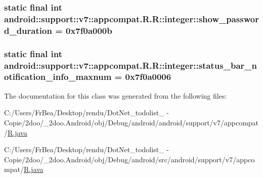 \hypertarget{classandroid_1_1support_1_1v7_1_1appcompat_1_1_r_1_1integer_13473fc83ffcfaf1a80dd29544f8f4f2}{
\subsubsection[{show\_\-password\_\-duration}]{\setlength{\rightskip}{0pt plus 5cm}static final int android::support::v7::appcompat.R.R::integer::show\_\-password\_\-duration = 0x7f0a000b}}
\label{classandroid_1_1support_1_1v7_1_1appcompat_1_1_r_1_1integer_13473fc83ffcfaf1a80dd29544f8f4f2}


\hypertarget{classandroid_1_1support_1_1v7_1_1appcompat_1_1_r_1_1integer_63da2e06b9c398514e5229d5230f605a}{
\subsubsection[{status\_\-bar\_\-notification\_\-info\_\-maxnum}]{\setlength{\rightskip}{0pt plus 5cm}static final int android::support::v7::appcompat.R.R::integer::status\_\-bar\_\-notification\_\-info\_\-maxnum = 0x7f0a0006}}
\label{classandroid_1_1support_1_1v7_1_1appcompat_1_1_r_1_1integer_63da2e06b9c398514e5229d5230f605a}




The documentation for this class was generated from the following files:\begin{CompactItemize}
\item 
C:/Users/FrBea/Desktop/rendu/DotNet\_\-todolist\_ - Copie/2doo/\_\-2doo.Android/obj/Debug/android/android/support/v7/appcompat/\hyperlink{android_2support_2v7_2appcompat_2_r_8java}{R.java}\item 
C:/Users/FrBea/Desktop/rendu/DotNet\_\-todolist\_ - Copie/2doo/\_\-2doo.Android/obj/Debug/android/src/android/support/v7/appcompat/\hyperlink{src_2android_2support_2v7_2appcompat_2_r_8java}{R.java}\end{CompactItemize}
